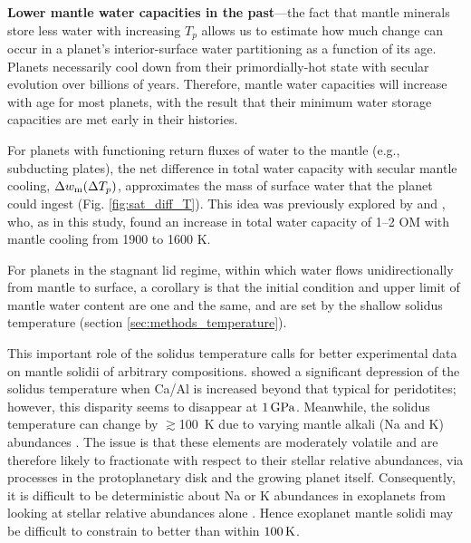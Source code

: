 \documentclass[fleqn,usenatbib]{mnras}
\newcommand{\todo}[1]{\textit{\textcolor{violet}{{#1}}}}
\begin{document}
\medskip

\textbf{Lower mantle water capacities in the past}---the fact that mantle minerals store less water with increasing $T_p$ allows us to estimate how much change can occur in a planet's interior-surface water partitioning as a function of its age. Planets necessarily cool down from their primordially-hot state with secular evolution over billions of years. Therefore, mantle water capacities will increase with age for most planets, with the result that their minimum water storage capacities are met early in their histories.


For planets with functioning return fluxes of water to the mantle (e.g., subducting plates), the net difference in total water capacity with secular mantle cooling, $\Delta w_{\rm m} (\Delta T_p)$, approximates the mass of surface water that the planet could ingest (Fig. \ref{fig:sat_diff_T}). This idea was previously explored by \citet{dong_constraining_2021, dong_water_2022} and \citet{andrault_mantle_2022}, who, as in this study, found an increase in total water capacity of 1--2 OM with mantle cooling from 1900 to 1600 K. %


For planets in the stagnant lid regime, within which water flows unidirectionally from mantle to surface, a corollary is that the initial condition and upper limit of mantle water content are one and the same, and are set by the shallow solidus temperature (section \ref{sec:methods_temperature}). 

This important role of the solidus temperature calls for better experimental data on mantle solidii of arbitrary compositions. \citet{brugman_experimental_2021} showed a significant depression of the solidus temperature when Ca/Al is increased beyond that typical for peridotites; however, this disparity seems to disappear at $1\,{\rm GPa}$. Meanwhile, the solidus temperature can change by $\gtrsim$100~K due to varying mantle alkali (Na and K) abundances \citep{hirschmann_mantle_2000}. The issue is that these elements are moderately volatile and are therefore likely to fractionate with respect to their stellar relative abundances, via processes in the protoplanetary disk and the growing planet itself. Consequently, it is difficult to be deterministic about Na or K abundances in exoplanets from looking at stellar relative abundances alone \citep[see][]{wang_detailed_2022}. Hence exoplanet mantle solidi may be difficult to constrain to better than within $100\,{\rm K}$. 
\end{document}
